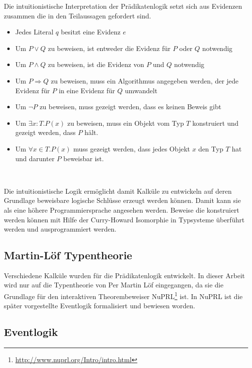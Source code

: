 \begin{defi}
  Die intuitionistische Interpretation der Prädikatenlogik setzt sich aus
  Evidenzen zusammen die in den Teilaussagen gefordert sind.
  \begin{itemize}
  \item Jedes Literal $q$ besitzt eine Evidenz $e$
  \item Um $P\vee Q$ zu beweisen, ist entweder die Evidenz für $P$ oder $Q$
    notwendig
  \item Um $P\wedge Q$ zu beweisen, ist die Evidenz von $P$ und $Q$ notwendig
  \item Um $P\Rightarrow Q$ zu beweisen, muss ein Algorithmus angegeben werden, der jede
    Evidenz für $P$ in eine Evidenz für $Q$ umwandelt 
  \item Um $\neg P$ zu beweisen, muss gezeigt werden, dass es keinen Beweis gibt
  \item Um $\exists x:T.P(x)$ zu beweisen, muss ein Objekt vom Typ $T$ konstruiert
    und gezeigt werden, dass $P$ hält.
  \item Um $\forall x\in T.P(x)$ muss gezeigt werden, dass jedes Objekt $x$ den Typ $T$
    hat und darunter $P$ beweisbar ist.
  \end{itemize}
\end{defi}~\cite{sep-mathematics-constructive}

Die intuitionistische Logik ermöglicht damit Kalküle zu entwickeln auf
deren Grundlage beweisbare logische Schlüsse erzeugt werden können.
Damit kann sie als eine höhere Programmiersprache angesehen werden.
Beweise die konstruiert werden können mit Hilfe der Curry-Howard Isomorphie
in Typsysteme überführt werden und ausprogrammiert werden.~\cite{constable1970constructive}


\subsection{Martin-Löf Typentheorie}
Verschiedene Kalküle wurden für die Prädikatenlogik entwickelt.
In dieser Arbeit wird nur auf die Typentheorie von Per Martin Löf eingegangen,
da sie die Grundlage für den interaktiven Theorembeweiser
NuPRL\footnote{\url{http://www.nuprl.org/Intro/intro.html}} ist. In NuPRL ist
die später vorgestellte Eventlogik formalisiert und bewiesen worden.



\subsection{Eventlogik}

